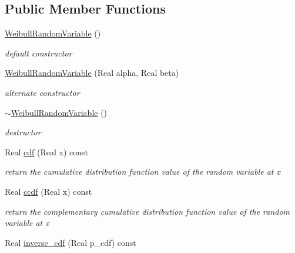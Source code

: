 \subsection*{Public Member Functions}
\begin{DoxyCompactItemize}
\item 
\hyperlink{classPecos_1_1WeibullRandomVariable_a02176d2bc8d1db87aa0bf10f81d55b15}{Weibull\+Random\+Variable} ()\label{classPecos_1_1WeibullRandomVariable_a02176d2bc8d1db87aa0bf10f81d55b15}

\begin{DoxyCompactList}\small\item\em default constructor \end{DoxyCompactList}\item 
\hyperlink{classPecos_1_1WeibullRandomVariable_a3ba7dfa93687e63f05497ab4d2e8f4d6}{Weibull\+Random\+Variable} (Real alpha, Real beta)\label{classPecos_1_1WeibullRandomVariable_a3ba7dfa93687e63f05497ab4d2e8f4d6}

\begin{DoxyCompactList}\small\item\em alternate constructor \end{DoxyCompactList}\item 
\hyperlink{classPecos_1_1WeibullRandomVariable_a6b743dce40d5ffefdde2ff9cfd9976cc}{$\sim$\+Weibull\+Random\+Variable} ()\label{classPecos_1_1WeibullRandomVariable_a6b743dce40d5ffefdde2ff9cfd9976cc}

\begin{DoxyCompactList}\small\item\em destructor \end{DoxyCompactList}\item 
Real \hyperlink{classPecos_1_1WeibullRandomVariable_addd564e7f4f314e12d38df74d845f0d8}{cdf} (Real x) const \label{classPecos_1_1WeibullRandomVariable_addd564e7f4f314e12d38df74d845f0d8}

\begin{DoxyCompactList}\small\item\em return the cumulative distribution function value of the random variable at x \end{DoxyCompactList}\item 
Real \hyperlink{classPecos_1_1WeibullRandomVariable_a23c3b599e7e4788a9a5e9e93c3dbaf4d}{ccdf} (Real x) const \label{classPecos_1_1WeibullRandomVariable_a23c3b599e7e4788a9a5e9e93c3dbaf4d}

\begin{DoxyCompactList}\small\item\em return the complementary cumulative distribution function value of the random variable at x \end{DoxyCompactList}\item 
Real \hyperlink{classPecos_1_1WeibullRandomVariable_a918a1aac05ca349ea5313eebcba46c3e}{inverse\+\_\+cdf} (Real p\+\_\+cdf) const \label{classPecos_1_1WeibullRandomVariable_a918a1aac05ca349ea5313eebcba46c3e}


\end{DoxyCompactItemize}
